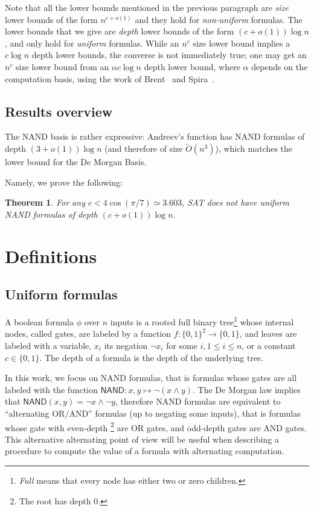 \documentclass[a4paper, 11pt]{article}
\theoremstyle{plain}
\newtheorem{theorem}{Theorem}[section] %
\theoremstyle{definition}
\theoremstyle{remark}
\newcommand{\bit}{\{0,1\}}%
\newcommand{\Ot}[1]{\widetilde{O}\left( #1 \right)}%
\newcommand{\SAT}{\textsf{SAT}}%
\newcommand{\NAND}{\textsf{NAND}}%
\newcommand{\todoh}[1]{\todo[inline]{TODO: #1 }}%
\begin{document}
Note that all the lower bounds mentioned in the previous paragraph 
are \textit{size} lower bounds of the form $n^{c + o(1)}$
and they hold for \textit{non-uniform} formulas.  
The lower bounds that we give are \textit{depth} lower bounds of the form $(c + o(1))\log n$,
and only hold for \textit{uniform} formulas.
While an $n^c$ size lower bound implies a $c\log n$ depth lower bounds,
the converse is not immediately true; 
one may get an $n^c$ size lower bound from an
$\alpha c\log n$ depth lower bound, where $\alpha$ depends on the computation basis,
using the work of Brent~\cite{brent1974parallel} and Spira~\cite{spira1971time}.

\subsection{Results overview}

The \NAND{} basis is rather expressive: Andreev's function has \NAND{} formulas of depth $(3+o(1)) \log n$ (and therefore of size $\Ot{n^3}$), which matches the lower bound for the De Morgan Basis.
\todoh{more about nand?}

Namely, we prove the following:
\begin{theorem}\label{thm:main}
	For any $c < 4 \cos(\pi/7) \simeq 3.603$, \SAT{} does not have 
	uniform \NAND{} formulas of depth $(c + o(1)) \log n$.
\end{theorem}

\section{Definitions}

\subsection{Uniform formulas}
A boolean formula $\phi$ over $n$ inputs is a 
rooted full binary tree\footnote{\textit{Full} means that every node has either two or zero children.}
whose internal nodes, called gates, are labeled by a function $f: \bit^2 \rightarrow \bit$,
and leaves are labeled with a variable, $x_i$ its negation $\neg x_i$ for some $i, 1\le i \le n$,
or a constant $c\in\bit$.
The depth of a formula is the depth of the underlying tree.

In this work, we focus on \NAND{} formulas, that is formulas whose gates are all labeled 
with the function $\NAND: x,y \mapsto \neg(x\wedge y)$.
The De Morgan law implies that $\NAND(x, y) = \neg x \wedge \neg y$, 
therefore \NAND{} formulas are equivalent to ``alternating OR/AND'' formulas (up to negating some inputs), 
that is formulas whose gate with even-depth \footnote{The root has depth 0.} 
are OR gates, and odd-depth gates are AND gates.
This alternative alternating point of view will be useful 
when describing a procedure to compute the value of a formula with alternating computation.
\end{document}
